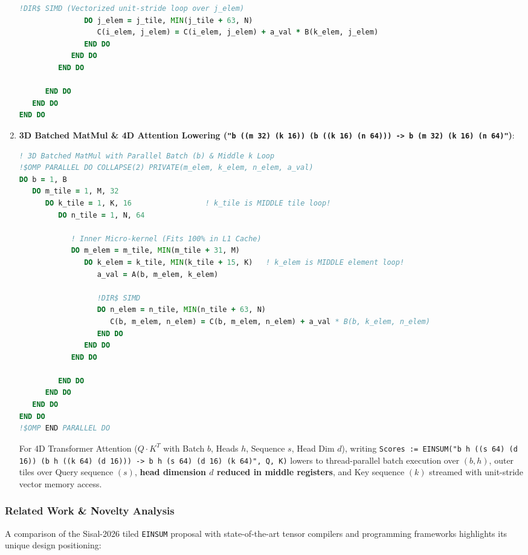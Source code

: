\begin{enumerate}
\begin{lstlisting}[language=Fortran]
               !DIR$ SIMD (Vectorized unit-stride loop over j_elem)
               DO j_elem = j_tile, MIN(j_tile + 63, N)
                  C(i_elem, j_elem) = C(i_elem, j_elem) + a_val * B(k_elem, j_elem)
               END DO
            END DO
         END DO

      END DO
   END DO
END DO
\end{lstlisting}

    \item \textbf{3D Batched MatMul \& 4D Attention Lowering (\texttt{"b ((m 32) (k 16)) (b ((k 16) (n 64))) -> b (m 32) (k 16) (n 64)"})}:
\begin{lstlisting}[language=Fortran]
! 3D Batched MatMul with Parallel Batch (b) & Middle k Loop
!$OMP PARALLEL DO COLLAPSE(2) PRIVATE(m_elem, k_elem, n_elem, a_val)
DO b = 1, B
   DO m_tile = 1, M, 32
      DO k_tile = 1, K, 16                 ! k_tile is MIDDLE tile loop!
         DO n_tile = 1, N, 64
            
            ! Inner Micro-kernel (Fits 100% in L1 Cache)
            DO m_elem = m_tile, MIN(m_tile + 31, M)
               DO k_elem = k_tile, MIN(k_tile + 15, K)   ! k_elem is MIDDLE element loop!
                  a_val = A(b, m_elem, k_elem)
                  
                  !DIR$ SIMD
                  DO n_elem = n_tile, MIN(n_tile + 63, N)
                     C(b, m_elem, n_elem) = C(b, m_elem, n_elem) + a_val * B(b, k_elem, n_elem)
                  END DO
               END DO
            END DO

         END DO
      END DO
   END DO
END DO
!$OMP END PARALLEL DO
\end{lstlisting}
    For 4D Transformer Attention ($Q \cdot K^T$ with Batch $b$, Heads $h$, Sequence $s$, Head Dim $d$), writing \texttt{Scores := EINSUM("b h ((s 64) (d 16)) (b h ((k 64) (d 16))) -> b h (s 64) (d 16) (k 64)", Q, K)} lowers to thread-parallel batch execution over $(b, h)$, outer tiles over Query sequence $(s)$, \textbf{head dimension $d$ reduced in middle registers}, and Key sequence $(k)$ streamed with unit-stride vector memory access.
\end{enumerate}

\subsubsection{Related Work \& Novelty Analysis}

A comparison of the Sisal-2026 tiled \texttt{EINSUM} proposal with state-of-the-art tensor compilers and programming frameworks highlights its unique design positioning:

